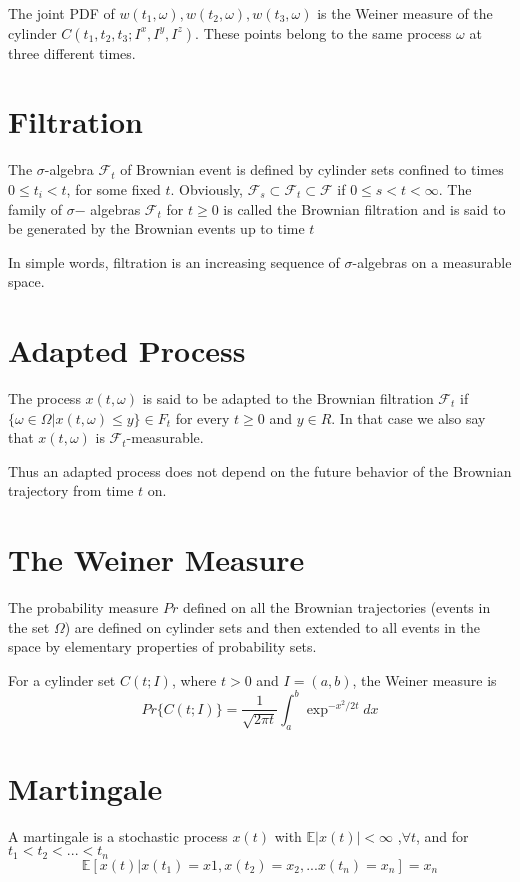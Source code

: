 \documentclass[12pt]{report}
\begin{document}
The joint PDF of $w(t_1,\omega),w(t_2,\omega),w(t_3,\omega)$ is the Weiner measure of the cylinder $C(t_1,t_2,t_3;I^x,I^y,I^z)$. These points belong to the same process $\omega$ at three different times. 

\section{Filtration}
The $\sigma$-algebra $\mathcal{F}_t$ of Brownian event is defined by cylinder
sets confined to times $0\leq t_i < t$, for some fixed $t$. Obviously, $\mathcal{F}_s \subset \mathcal{F}_t \subset \mathcal{F}$ if $0\leq s < t <\infty$. The family of $\sigma$− algebras $\mathcal{F}_t$ for $t \geq 0$ is called the Brownian filtration and is said to be generated by the Brownian events up to time $t$

In simple words, filtration is an increasing sequence of $\sigma$-algebras on a measurable space. 

\section{Adapted Process}
The process $x(t,\omega)$ is said to be adapted
to the Brownian filtration $\mathcal{F}_t$ if $\{\omega\in\Omega|x(t,\omega) \leq y\} \in F_t$ for every $t \geq 0$ and
$y\in R$. In that case we also say that $x(t, \omega)$ is $\mathcal{F}_t$-measurable.

Thus an adapted process does not depend on the future behavior of the Brownian trajectory from time $t$ on.

\section{The Weiner Measure}\label{theWeinerMeasure}
The probability measure $Pr$ defined on all the Brownian trajectories (events in the set $\Omega$) are defined on cylinder sets and then extended to all events in the space by elementary properties of probability sets.

For a cylinder set $C(t;I)$, where $t>0$ and $I=(a,b)$, the Weiner measure is 
\begin{equation*}
Pr\{C(t;I)\}=\frac{1}{\sqrt{2\pi t}}\int_a^b\exp^{-x^2/2t}dx
\end{equation*}

\section{Martingale}\label{martingale}
A martingale is a stochastic process $ x(t)$ with $\mathbb{E}|x(t)|<\infty$ ,$\forall t$, and for $t_1<t_2<...<t_n$
\begin{equation*}
\mathbb{E}[x(t)|x(t_1)=x1,x(t_2)=x_2,...x(t_n)=x_n]=x_n
\end{equation*}
\end{document}
